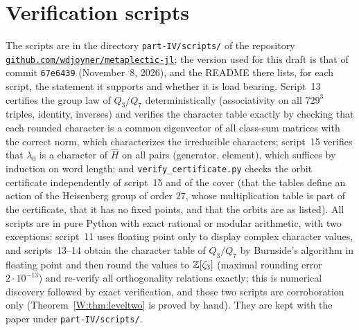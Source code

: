 \section{Verification scripts}\label{W:app:scripts}
The scripts are in the directory \texttt{part-IV/scripts/} of the
repository \href{https://github.com/wdjoyner/metaplectic-jl}{\nolinkurl{github.com/wdjoyner/metaplectic-jl}}; the version used
for this draft is that of commit \texttt{67e6439} (November~8, 2026), and the README there
lists, for each script, the statement it supports and whether it is
load bearing.  Script~13 certifies the group law of
$Q_3/Q_7$ deterministically (associativity on all $729^3$ triples,
identity, inverses) and verifies the character table exactly by checking
that each rounded character is a common eigenvector of all class-sum
matrices with the correct norm, which characterizes the irreducible
characters; script~15 verifies that $\lambda_0$ is a character of
$\hat H$ on all pairs (generator, element), which suffices by induction
on word length; and \texttt{verify\_certificate.py} checks the orbit
certificate independently of script~15 and of the cover (that the
tables define an action of the Heisenberg group of order $27$, whose
multiplication table is part of the certificate, that it has no fixed
points, and that the orbits are as listed).
All scripts are in pure Python with exact rational or modular
arithmetic, with two exceptions: script~11 uses floating point only to
display complex character values, and scripts~13--14 obtain the
character table of $Q_3/Q_7$ by Burnside's algorithm in floating point
and then round the values to $\mathbb Z[\zeta_3]$ (maximal rounding error
$2\cdot10^{-13}$) and re-verify all orthogonality relations exactly;
this is numerical discovery followed by exact verification, and those two scripts are corroboration only
(Theorem~\ref{W:thm:leveltwo} is proved by hand).  They are kept with the
paper under \texttt{part-IV/scripts/}.
